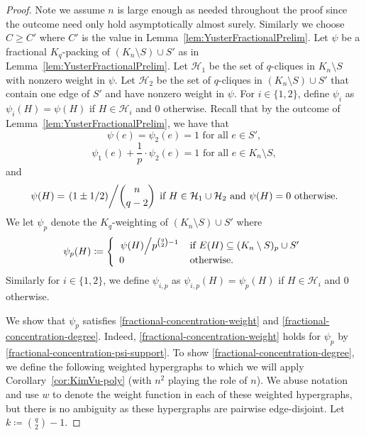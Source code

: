 \documentclass[11pt]{article}
\numberwithin{equation}{section}
\newcommand{\mc}[1]{\mathcal{#1}}
\newcounter{i}
\theoremstyle{plain}
\theoremstyle{plain} %
\theoremstyle{definition}
\newcommand{\cH}{\mathcal{H}}
\begin{document}
\begin{proof}
Note we assume $n$ is large enough as needed throughout the proof since the outcome need only hold asymptotically almost surely. Similarly we choose $C\ge C'$ where $C'$ is the value in Lemma~\ref{lem:YusterFractionalPrelim}. Let $\psi$ be a fractional $K_q$-packing of $(K_n\setminus S) \cup S'$ as in Lemma~\ref{lem:YusterFractionalPrelim}. Let $\mc{H}_1$ be the set of $q$-cliques in $K_n\setminus S$ with nonzero weight in $\psi$. Let $\mc{H}_2$ be the set of $q$-cliques in $(K_n\setminus S)\cup S'$ that contain one edge of $S'$ and have nonzero weight in $\psi$.
For $i\in \{1,2\}$, define $\psi_i$ as $\psi_i(H)=\psi(H)$ if $H\in \mc{H}_i$ and $0$ otherwise. Recall that by the outcome of Lemma~\ref{lem:YusterFractionalPrelim}, we have that 
\begin{equation}\label{fractional-concentrated-psi-e-in-S'}
    \psi(e)=\psi_2(e)=1 \text{ for all } e\in S',
\end{equation}
\begin{equation}\label{fractional-concentrated-psi-e-notin-S'}
    \psi_1(e)+\frac{1}{p}\cdot \psi_2(e) = 1 \text{ for all } e\in K_n\setminus S,
\end{equation}
and
\begin{equation}\label{fractional-concentration-psi-support}
    \text{$\psi(H) = \left.(1 \pm 1/2) \middle/\binom{n}{q-2}\right.$ if $H \in \cH_1 \cup \cH_2$ and $\psi(H) = 0$ otherwise.}
\end{equation}
We let $\psi_p$ denote the $K_q$-weighting of $(K_n\setminus S)\cup S'$ where 
\begin{equation*}
    \psi_p(H) \coloneqq \left\{\begin{array}{l l}
    \left.\psi(H)\middle/p^{\binom{q}{2}-1}\right. &\text{if } E(H)\subseteq (K_n\setminus S)_p\cup S'\\
    0 &\text{otherwise.}
    \end{array}\right.
\end{equation*}
Similarly for $i\in\{1,2\}$, we define $\psi_{i,p}$ as $\psi_{i,p}(H)=\psi_p(H)$ if $H\in \mc{H}_i$ and $0$ otherwise.

We show that $\psi_p$ satisfies \ref{fractional-concentration-weight} and \ref{fractional-concentration-degree}.  
Indeed, \ref{fractional-concentration-weight} holds for $\psi_p$ by \eqref{fractional-concentration-psi-support}.  To show \ref{fractional-concentration-degree}, we define the following weighted hypergraphs to which we will apply Corollary~\ref{cor:KimVu-poly} (with $n^2$ playing the role of $n$).  
We abuse notation and use $w$ to denote the weight function in each of these weighted hypergraphs, but there is no ambiguity as these hypergraphs are pairwise edge-disjoint.  Let $k \coloneqq \binom{q}{2}-1$.


\end{proof}
\end{document}
